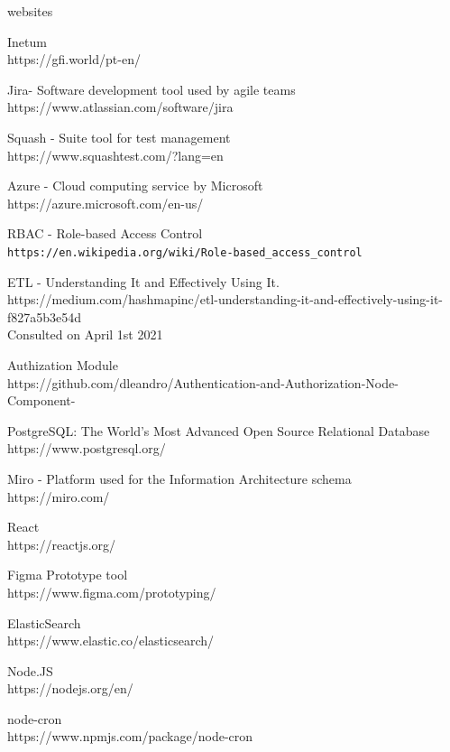 \documentclass[a4paper,twoside,10pt]{report}
\begin{document}
\begin{thebibliography} {websites}

 Inetum\\ https://gfi.world/pt-en/

 Jira- Software development tool used by agile teams\\
https://www.atlassian.com/software/jira

 Squash - Suite tool for test management\\
https://www.squashtest.com/?lang=en

 Azure - Cloud computing service by Microsoft\\
https://azure.microsoft.com/en-us/

 RBAC - Role-based Access Control\\
\texttt{https://en.wikipedia.org/wiki/Role-based\_access\_control}

 ETL - Understanding It and Effectively Using It.\\
https://medium.com/hashmapinc/etl-understanding-it-and-effectively-using-it-f827a5b3e54d\\
Consulted on April 1st 2021

 Authization Module\\
https://github.com/dleandro/Authentication-and-Authorization-Node-Component-

 PostgreSQL: The World's Most Advanced Open Source Relational Database\\
https://www.postgresql.org/

 Miro - Platform used for the Information Architecture schema\\
https://miro.com/

 React\\ https://reactjs.org/

 Figma Prototype tool\\https://www.figma.com/prototyping/

 ElasticSearch \\ https://www.elastic.co/elasticsearch/

 Node.JS \\ https://nodejs.org/en/

 node-cron \\ https://www.npmjs.com/package/node-cron
\end{thebibliography}
\end{document}
